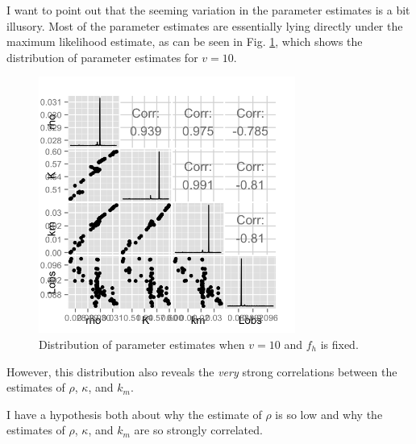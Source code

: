 \documentclass[12pt,reqno,final,pdftex]{amsart}\usepackage[]{graphicx}\usepackage[]{color}
\newenvironment{knitrout}{}{} %
\theoremstyle{plain}
\numberwithin{equation}{part}
\begin{document}
I want to point out that the seeming variation in the parameter estimates is a bit illusory.
Most of the parameter estimates are essentially lying directly under the maximum likelihood estimate, as can be seen in Fig. \ref{fig:estimates-v-10}, which shows the distribution of parameter estimates for $v=10$.
\begin{knitrout}\scriptsize
{}\color{fgcolor}\begin{figure}

\includegraphics[width=0.75\textwidth]{figure/estimates-v-10-1} \hfill{}

\caption[Distribution of parameter estimates when ]{Distribution of parameter estimates when $v=10$ and $f_h$ is fixed.}\label{fig:estimates-v-10}
\end{figure}


\end{knitrout}
However, this distribution also reveals the \emph{very} strong correlations between the estimates of $\rho$, $\kappa$, and $k_m$.

\clearpage

I have a hypothesis both about why the estimate of $\rho$ is so low and why the estimates of $\rho$, $\kappa$, and $k_m$ are so strongly correlated.
\end{document}
